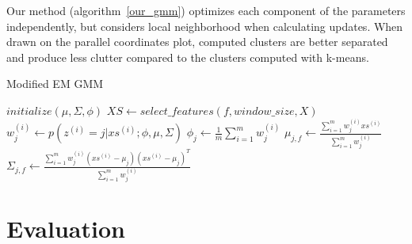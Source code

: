 \documentclass[10pt,a4paper]{article}
\begin{document}
Our method (algorithm~\ref{our_gmm}) optimizes each component of the parameters independently, but considers local neighborhood when calculating updates. When drawn on the parallel coordinates plot, computed clusters are better separated and produce less clutter compared to the clusters computed with k-means.
\begin{algorithm}
\caption{Modified EM GMM}
\label{our_gmm}
\begin{algorithmic}
\State $initialize(\mu, \Sigma, \phi)$
        \State $XS\gets select\_features(f, window\_size, X)$
            \State $w_j^{(i)}\gets p(z^{(i)} = j|xs^{(i)}; \phi, \mu, \Sigma)$
        \EndFor
        \State
        \State $\phi_{j}\gets\frac{1}{m}\sum_{i=1}^{m}w_j^{(i)}$
        \State $\mu_{j,f}\gets\frac{\sum_{i=1}^mw_j^{(i)}xs^{(i)}}{\sum_{i=1}^mw_j^{(i)}}$
        \State $\Sigma_{j,f}\gets\frac{\sum_{i=1}^mw_j^{(i)}(xs^{(i)}-\mu_j)(xs^{(i)}-\mu_j)^T}{\sum_{i=1}^mw_j^{(i)}}$
    \EndFor
\EndFor
\EndFunction
\end{algorithmic}
\end{algorithm}

\section{Evaluation}
\end{document}
